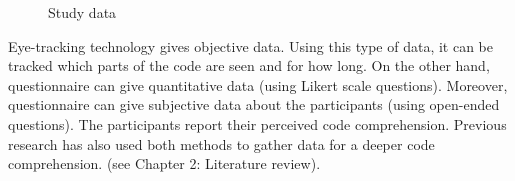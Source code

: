 \begin{figure} [H]
  \centering
  
  \caption{Study data}
  \label{fig:AnhangsChor}




\end{figure}

 

Eye-tracking technology gives objective data. Using this type of data, it can be tracked which parts of the code are seen and for how long. On the other hand, questionnaire can give quantitative data (using Likert scale questions). Moreover, questionnaire can give subjective data about the participants (using open-ended questions). The participants report their perceived code comprehension.  
Previous research has also used both methods to gather data for a deeper code comprehension. (see Chapter 2: Literature review). 


